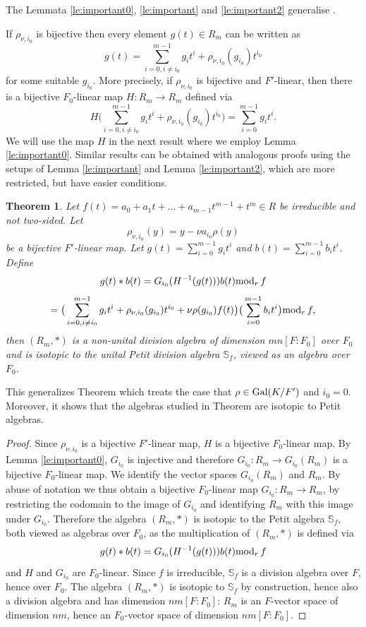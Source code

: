 \documentclass[12pt]{amsart}
\theoremstyle{plain}
\newtheorem{theorem}{Theorem}[section]
\theoremstyle{definition}
\numberwithin{equation}{section}
\numberwithin{figure}{section}
\begin{document}
The Lemmata \ref{le:important0}, \ref{le:important} and \ref{le:important2}  generalise \cite[Lemma 5.2, Lemma 5.3]{NewS}.

If $\rho_{\nu,i_0}$ is bijective then every element $g(t)\in R_m$ can be written as
$$ g(t)=\sum_{i=0,i\not=i_0}^{m-1} g_it^i +\rho_{\nu,i_0}(g_{i_0})t^{i_0}$$
for some suitable $g_{i_0}$. More precisely, if $\rho_{\nu,i_0}$ is bijective and $F'$-linear, then there is a bijective $F_0$-linear map
$H: R_m\to R_m$ defined via
$$H\big(\sum_{i=0,i\not=i_0}^{m-1} g_it^i +\rho_{\nu,i_0}(g_{i_0})t^{i_0}\big) = \sum_{i=0}^{m-1} g_it^i .$$
 We will use the map $H$ in the next result where we employ Lemma \ref{le:important0}. Similar results can be obtained with analogous proofs using the setups of Lemma \ref{le:important} and Lemma \ref{le:important2}, which are more restricted, but have easier conditions.


\begin{theorem}\label{thm:algebra2}
Let $f(t)=a_0+a_1t+\dots+ a_{m-1} t^{m-1}+t^m \in R$ be  irreducible  and not two-sided. Let
$$\rho_{\nu,i_0}(y)=y-\nu a_{i_0}\rho(y)$$
 be a bijective $F'$-linear map.
  Let $ g(t)=\sum_{i=0}^{m-1} g_it^i $ and $b(t)=\sum_{i=0}^{m-1} b_it^i$.
 Define
$$g(t) * b(t) =G_{i_0}(H^{-1}(g(t))) b(t){\rm mod}_r\,f$$
$$=\big(\sum_{i=0,i\not=i_0}^{m-1} g_it^i +\rho_{\nu,i_0}(g_{i_0})t^{i_0} + \nu\rho(g_{i_0})f(t)\big) \big( \sum_{i=0}^{m-1} b_it^i\big) {\rm mod}_r\,f,$$
 then $(R_m,*)$ is a non-unital division algebra  of dimension $mn[F:F_0]$ over $F_0$
 and is isotopic to the unital Petit division algebra $\mathbb{S}_f$, viewed as an algebra over $F_0$.
\end{theorem}

This generalizes Theorem \cite[Theorem 5.4]{NewS} which treats the case that $\rho\in {\rm Gal}(K/F')$ and $i_0=0$. Moreover, it shows that the algebras studied in Theorem \cite[Theorem 5.4]{NewS} are isotopic to Petit algebras.

\begin{proof}
Since $\rho_{\nu,i_0}$ is a bijective $F'$-linear map,  $H$ is a bijective $F_0$-linear map.
By Lemma \ref{le:important0},  $G_{i_0}$ is injective and therefore $G_{i_0}:R_m\to G_{i_0}(R_m)$  is a bijective $F_0$-linear map. We  identify the vector spaces $G_{i_0}(R_m)$ and $R_m$. By abuse of notation we thus obtain a bijective $F_0$-linear map $G_{i_0}:R_m\to R_m$, by restricting the codomain to the image of $G_{i_0}$ and identifying $R_m$ with this image under $G_{i_0}$.
    Therefore the algebra $(R_m,*)$ is isotopic to the Petit algebra $\mathbb{S}_f$, both viewed as algebras over $F_0$, as the multiplication of $(R_m,*)$ is defined via
  $$g(t) * b(t) =G_{i_0}( H^{-1}(g(t))) b(t) {\rm mod}_r\,f$$
  and $H$ and $G_{i_0}$ are $F_0$-linear.
  Since $f$ is irreducible, $\mathbb{S}_f$ is a division algebra over $F$, hence over $F_0$. The algebra $(R_m,*)$ is isotopic to $\mathbb{S}_f$ by construction, hence also a division algebra and has dimension $nm[F:F_0]$:
$R_m$ is an $F$-vector space of dimension $nm$, hence an $F_0$-vector space of dimension $nm[F:F_0]$.
\end{proof}
\end{document}

